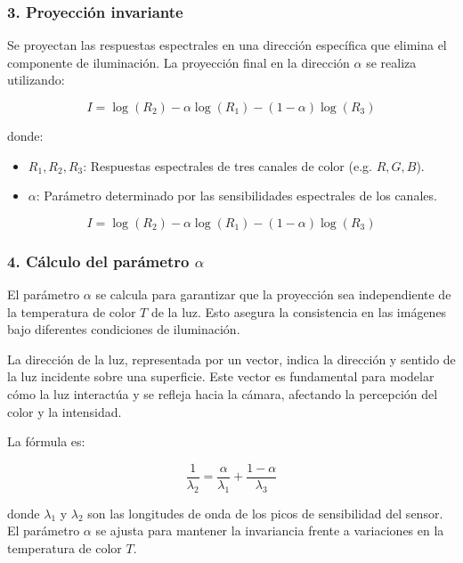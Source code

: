 \subsubsection{3. Proyección invariante}

Se proyectan las respuestas espectrales en una dirección específica que elimina el componente de iluminación. La proyección final en la dirección $\alpha$ se realiza utilizando:

$$I=\log (R_2 )-\alpha \log (R_1 )-(1-\alpha )\log (R_3 )$$

donde:

\begin{itemize}
\setlength{\itemsep}{-1ex}
   \item{\begin{flushleft} $R_1 ,R_2 ,R_3$: Respuestas espectrales de tres canales de color (e.g. $R,G,B$). \end{flushleft}}
   \item{\begin{flushleft} $\alpha$: Parámetro determinado por las sensibilidades espectrales de los canales. \end{flushleft}}
\end{itemize}

$$I=\log (R_2 )-\alpha \log (R_1 )-(1-\alpha )\log (R_3 )$$

\subsubsection{4. Cálculo del parámetro $\alpha$}

El parámetro $\alpha$ se calcula para garantizar que la proyección sea independiente de la temperatura de color $T$ de la luz. Esto asegura la consistencia en las imágenes bajo diferentes condiciones de iluminación.

La dirección de la luz, representada por un vector, indica la dirección y sentido de la luz incidente sobre una superficie. Este vector es fundamental para modelar cómo la luz interactúa y se refleja hacia la cámara, afectando la percepción del color y la intensidad.

La fórmula es:

$$\frac{1}{\lambda_2 }=\frac{\alpha }{\lambda_1 }+\frac{1-\alpha }{\lambda_3 }$$

donde $\lambda_1$ y $\lambda_2$ son las longitudes de onda de los picos de sensibilidad del sensor. El parámetro $\alpha$ se ajusta para mantener la invariancia frente a variaciones en la temperatura de color $T$.

